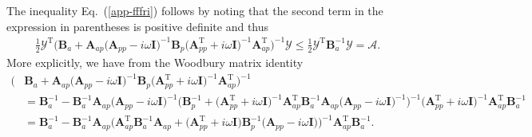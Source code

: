 \documentclass[aps,pre,twocolumn,superscriptaddress,notitlepage]{revtex4-2}
\newcommand{\nn}{\nonumber \\}
\newcommand{\n}{\nonumber}
\newcommand{\bmc}[1]{\bm{\mathcal{#1}}}
\renewcommand{\eqref}[1]{Eq.~(\ref{#1})}
\begin{document}
The inequality \eqref{app-fffri} follows by noting that the second term in the expression in parentheses is positive definite and thus
\begin{align}
\frac{1}{2} \bmc{Y}^\text{T} \Big( \bm{B}_a + \bm{A}_{ap} \big(\bm{A}_{pp} - i \omega \bm{I} \big)^{-1} \bm{B}_p \big(\bm{A}_{pp}^\text{T} + i \omega \bm{I} \big)^{-1} \bm{A}_{ap}^\text{T} \Big)^{-1} \bmc{Y} \leq \frac{1}{2} \bmc{Y}^\text{T} \bm{B}_a^{-1} \bmc{Y} = \bmc{A} .
\end{align}
More explicitly, we have from the Woodbury matrix identity
\begin{align}
\Big( &\bm{B}_a + \bm{A}_{ap} \big(\bm{A}_{pp} - i \omega \bm{I} \big)^{-1} \bm{B}_p \big(\bm{A}_{pp}^\text{T} + i \omega \bm{I} \big)^{-1} \bm{A}_{ap}^\text{T} \Big)^{-1} \label{woodbury} \\
&= \bm{B}_a^{-1} - \bm{B}_a^{-1} \bm{A}_{ap} \big(\bm{A}_{pp} - i \omega \bm{I} \big)^{-1} \Big( \bm{B}_p^{-1} + \big(\bm{A}_{pp}^\text{T} + i \omega \bm{I} \big)^{-1} \bm{A}_{ap}^\text{T} \bm{B}_a^{-1} \bm{A}_{ap}\big(\bm{A}_{pp} - i \omega \bm{I} \big)^{-1} \Big)^{-1} \big(\bm{A}_{pp}^\text{T} + i \omega \bm{I} \big)^{-1} \bm{A}_{ap}^\text{T} \bm{B}_a^{-1} \nn
&= \bm{B}_a^{-1} - \bm{B}_a^{-1} \bm{A}_{ap} \Big( \bm{A}_{ap}^\text{T} \bm{B}_a^{-1} \bm{A}_{ap} + \big(\bm{A}_{pp}^\text{T} + i \omega \bm{I} \big) \bm{B}_p^{-1} \big(\bm{A}_{pp} - i \omega \bm{I} \big) \Big)^{-1}  \bm{A}_{ap}^\text{T} \bm{B}_a^{-1}  . \n
\end{align}
\end{document}
